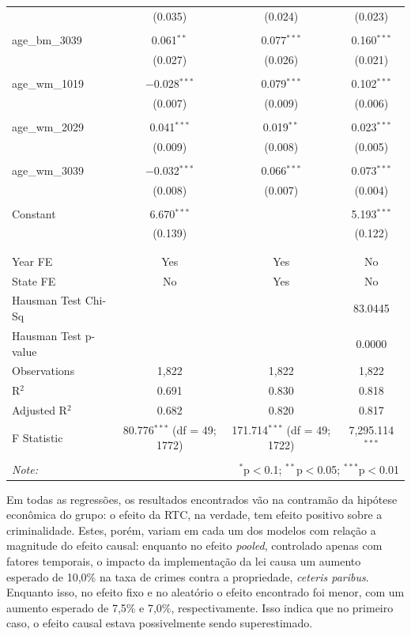 \documentclass[12pt]{article}
\begin{document}
\begin{table}[!htbp]
{\begin{tabular}{@{\extracolsep{5pt}}lccc}
    & (0.035) & (0.024) & (0.023) \\ 
    & & & \\ 
   age\_bm\_3039 & 0.061$^{**}$ & 0.077$^{***}$ & 0.160$^{***}$ \\ 
    & (0.027) & (0.026) & (0.021) \\ 
    & & & \\ 
   age\_wm\_1019 & $-$0.028$^{***}$ & 0.079$^{***}$ & 0.102$^{***}$ \\ 
    & (0.007) & (0.009) & (0.006) \\ 
    & & & \\ 
   age\_wm\_2029 & 0.041$^{***}$ & 0.019$^{**}$ & 0.023$^{***}$ \\ 
    & (0.009) & (0.008) & (0.005) \\ 
    & & & \\ 
   age\_wm\_3039 & $-$0.032$^{***}$ & 0.066$^{***}$ & 0.073$^{***}$ \\ 
    & (0.008) & (0.007) & (0.004) \\ 
    & & & \\ 
   Constant & 6.670$^{***}$ &  & 5.193$^{***}$ \\ 
    & (0.139) &  & (0.122) \\ 
    & & & \\ 
  \hline \\[-1.8ex] 
  Year FE & Yes & Yes & No \\ 
  State FE & No & Yes & No \\ 
  Hausman Test Chi-Sq &  &  & 83.0445 \\ 
  Hausman Test p-value &  &  & 0.0000 \\ 
  Observations & 1,822 & 1,822 & 1,822 \\ 
  R$^{2}$ & 0.691 & 0.830 & 0.818 \\ 
  Adjusted R$^{2}$ & 0.682 & 0.820 & 0.817 \\ 
  F Statistic & 80.776$^{***}$ (df = 49; 1772) & 171.714$^{***}$ (df = 49; 1722) & 7,295.114$^{***}$ \\ 
  \hline 
  \hline \\[-1.8ex] 
  \textit{Note:}  & \multicolumn{3}{r}{$^{*}$p$<$0.1; $^{**}$p$<$0.05; $^{***}$p$<$0.01} \\ 
  \end{tabular} 
  }  %
\end{table}



\newpage
Em todas as regressões, os resultados encontrados vão na contramão da
hipótese econômica do grupo: o efeito da RTC, na verdade, tem efeito
positivo sobre a criminalidade. Estes, porém, variam em cada um dos
modelos com relação a magnitude do efeito causal: enquanto no efeito
\emph{pooled}, controlado apenas com fatores temporais, o impacto da
implementação da lei causa um aumento esperado de 10,0\% na taxa de
crimes contra a propriedade, \emph{ceteris paribus}. Enquanto isso, no
efeito fixo e no aleatório o efeito encontrado foi menor, com um aumento esperado de
7,5\% e 7,0\%, respectivamente. Isso indica que no primeiro caso, o
efeito causal estava possivelmente sendo superestimado.
\end{document}
